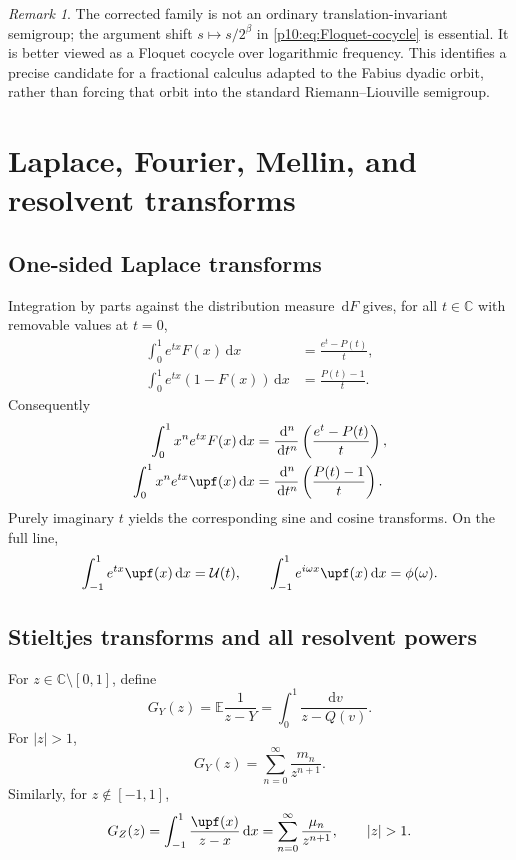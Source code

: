 \documentclass[11pt,oneside]{article}
\theoremstyle{definition}
\theoremstyle{remark}
\newtheorem{remark}[theorem]{Remark}
\newcommand{\F}{F}
\newcommand{\Q}{Q}
\newcommand{\E}{\mathbb E}
\newcommand{\C}{\mathbb C}
\newcommand{\dd}{\,\mathrm d}
\newcommand{\1}{\mathbf 1}
\begin{document}
\begin{remark}
The corrected family is not an ordinary translation-invariant semigroup; the argument
shift \(s\mapsto s/2^\beta\) in \eqref{p10:eq:Floquet-cocycle} is essential.  It is better
viewed as a Floquet cocycle over logarithmic frequency.  This identifies a precise
candidate for a fractional calculus adapted to the Fabius dyadic orbit, rather than
forcing that orbit into the standard Riemann--Liouville semigroup.
\end{remark}


\section{Laplace, Fourier, Mellin, and resolvent transforms}

\subsection{One-sided Laplace transforms}

Integration by parts against the distribution measure \(\dd\F\) gives, for all
\(t\in\C\) with removable values at \(t=0\),
\begin{align}
 \int_0^1e^{tx}\F(x)\dd x
 &=\frac{e^t-P(t)}t,
 \label{p10:eq:Laplace-F}\\
 \int_0^1e^{tx}(1-\F(x))\dd x
 &=\frac{P(t)-1}t.
 \label{p10:eq:Laplace-up-half}
\end{align}
Consequently
\begin{align}
 \int_0^1x^ne^{tx}\F(x)\dd x
 &=\frac{\dd^n}{\dd t^n}\left(\frac{e^t-P(t)}t\right),
 \label{p10:eq:exp-poly-F}\\
 \int_0^1x^ne^{tx}\upf(x)\dd x
 &=\frac{\dd^n}{\dd t^n}\left(\frac{P(t)-1}t\right).
 \label{p10:eq:exp-poly-up}
\end{align}
Purely imaginary \(t\) yields the corresponding sine and cosine transforms.  On the
full line,
\begin{equation}\label{p10:eq:bilateral-up-transform}
 \int_{-1}^1e^{tx}\upf(x)\dd x=\mathcal U(t),
 \qquad
 \int_{-1}^1e^{i\omega x}\upf(x)\dd x=\phi(\omega).
\end{equation}

\subsection{Stieltjes transforms and all resolvent powers}

For \(z\in\C\setminus[0,1]\), define
\begin{equation}\label{p10:eq:GY-def}
 G_Y(z)=\E\frac1{z-Y}
 =\int_0^1\frac{\dd v}{z-\Q(v)}.
\end{equation}
For \(|z|>1\),
\begin{equation}\label{p10:eq:GY-moment-series}
 G_Y(z)=\sum_{n=0}^{\infty}\frac{m_n}{z^{n+1}}.
\end{equation}
Similarly, for \(z\notin[-1,1]\),
\begin{equation}\label{p10:eq:GZ-def}
 G_Z(z)=\int_{-1}^1\frac{\upf(x)}{z-x}\dd x
 =\sum_{n=0}^{\infty}\frac{\mu_n}{z^{n+1}},
 \qquad |z|>1.
\end{equation}
\end{document}
